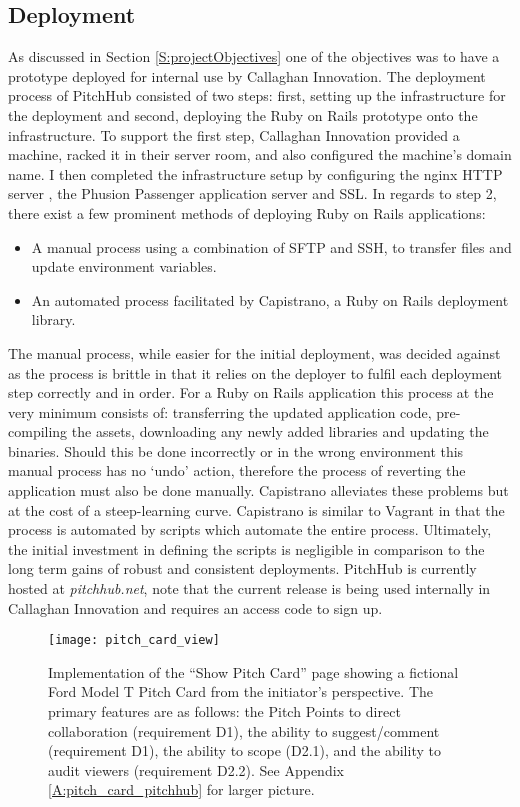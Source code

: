 \subsection{Deployment}
As discussed in Section \ref{S:projectObjectives} one of the objectives was to have a prototype deployed for internal use by Callaghan Innovation. The deployment process of PitchHub consisted of two steps: first, setting up the infrastructure for the deployment and second, deploying the Ruby on Rails prototype onto the infrastructure. To support the first step, Callaghan Innovation provided a machine, racked it in their server room, and also configured the machine's domain name. I then completed the infrastructure setup by configuring the nginx HTTP server \cite{nginx2:online}, the Phusion Passenger application server \cite{phusionPassenger:online} and SSL. In regards to step 2, there exist a few prominent methods of deploying Ruby on Rails applications:
\begin{itemize}
    \item A manual process using a combination of SFTP and SSH, to transfer files and update environment variables.
    \item An automated process facilitated by Capistrano, a Ruby on Rails deployment library.
\end{itemize}

The manual process, while easier for the initial deployment, was decided against as the process is brittle in that it relies on the deployer to fulfil each deployment step correctly and in order. For a Ruby on Rails application this process at the very minimum consists of: transferring the updated application code, pre-compiling the assets, downloading any newly added libraries and updating the binaries. Should this be done incorrectly or in the wrong environment this manual process has no `undo' action, therefore the process of reverting the application must also be done manually. Capistrano alleviates these problems but at the cost of a steep-learning curve. Capistrano is similar to Vagrant in that the process is automated by scripts which automate the entire process. Ultimately, the initial investment in defining the scripts is negligible in comparison to the long term gains of robust and consistent deployments. PitchHub is currently hosted at \textit{pitchhub.net}, note that the current release is being used internally in Callaghan Innovation and requires an access code to sign up.

\begin{figure}[ht]
    \centering
    \texttt{[image: pitch\_card\_view]}
    \caption{Implementation of the ``Show Pitch Card'' page showing a fictional Ford Model T Pitch Card from the initiator's perspective. The primary features are as follows: the Pitch Points to direct collaboration (requirement D1), the ability to suggest/comment (requirement D1), the ability to scope (D2.1), and the ability to audit viewers (requirement D2.2). See Appendix \ref{A:pitch_card_pitchhub} for larger picture.}
    \label{fig:show_pitch_card}
\end{figure}

